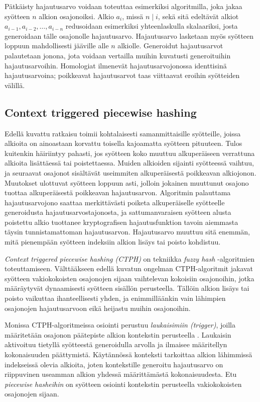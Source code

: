 \documentclass[12pt, a4paper]{article}
\begin{document}
	Pätkäisty hajautusarvo voidaan toteuttaa esimerkiksi
	algoritmilla, joka jakaa syötteen $n$ alkion osajonoiksi.
	Alkio $a_i$, missä $n \mid i$, sekä sitä
	edeltävät alkiot $a_{i - 1}, a_{i - 2}, \ldots, a_{i - n}$
	redusoidaan esimerkiksi yhteenlaskulla skalaariksi, josta generoidaan
	tälle osajonolle hajautusarvo. Hajautusarvo lasketaan myös syötteen
	loppuun mahdollisesti jääville alle $n$ alkiolle. Generoidut hajautusarvot
	palautetaan jonona, jota voidaan vertailla
	muihin kuvatusti generoituihin hajautusarvoihin. Homologiat
	ilmenevät hajautusarvojonossa identtisinä hajautusarvoina; poikkeavat
	hajautusarvot taas viittaavat eroihin syötteiden välillä.

	\subsection*{Context triggered piecewise hashing}

	Edellä kuvattu ratkaisu toimii kohtalaisesti samanmittaisille
	syötteille, joissa alkioita on ainoastaan korvattu toisella
	kajoamatta syötteen pituuteen.
	Tulos kuitenkin häiriintyy pahasti, jos
	syötteen koko muuttuu alkuperäiseen verrattuna alkioita
	lisättäessä tai poistettaessa. Muiden alkioiden
	sijainti syötteessä vaihtuu, ja seuraavat osajonot sisältävät
	useimmiten alkuperäisestä poikkeavan alkiojonon.
	Muutokset ulottuvat syötteen loppuun asti, jolloin
	jokainen muuttunut osajono tuottaa alkuperäisestä
	poikkeavan hajautusarvon. Algoritmin palauttama hajautusarvojono
	saattaa merkittävästi poiketa alkuperäiselle syötteelle
	generoidusta hajautusarvostajonosta, ja sattumanvaraisen syötteen
	alusta poistettu alkio tuottanee kryptografisen hajautusfunktion
	tavoin aiemmasta täysin tunnistamattoman hajautusarvon.
	Hajautusarvo muuttuu sitä enemmän, mitä pienempään syötteen
	indeksiin alkion lisäys tai poisto kohdistuu.

	\textit{Context triggered piecewise hashing (CTPH)} on tekniikka
	\textit{fuzzy hash} -algoritmien toteuttamiseen. Välttääkseen edellä kuvatun ongelman
	CTPH-algoritmit jakavat syötteen vakiokokoisten osajonojen
	sijaan vaihtelevan kokoisiin osajonoihin, jotka määräytyvät dynaamisesti
	syötteen sisällön perusteella. Tällöin alkion lisäys tai poisto vaikuttaa
	ihanteellisesti yhden, ja enimmilläänkin vain lähimpien osajonojen
	hajautusarvoon eikä heijastu muihin osajonoihin.

	Monissa CTPH-algoritmeissa osiointi perustuu \textit{laukaisimiin (trigger)},
	joilla määritetään osajonon päätepiste alkion kontekstin perusteella \parencite{IDENT}. Laukaisin
	aktivoituu tietyllä syötteestä generoidulla arvolla ja ilmaisee
	määritellyn kokonaisuuden päättymistä. Käytännössä konteksti tarkoittaa
	alkion lähimmissä indekseissä olevia alkioita, joten kontekstille generoitu 
	hajautusarvo on riippuvinen useamman alkion yhdessä määrittämästä kokonaisuudesta.
	Etu \textit{piecewise hasheihin} on syötteen osiointi
	kontekstin perusteella vakiokokoisten osajonojen sijaan.
\end{document}
